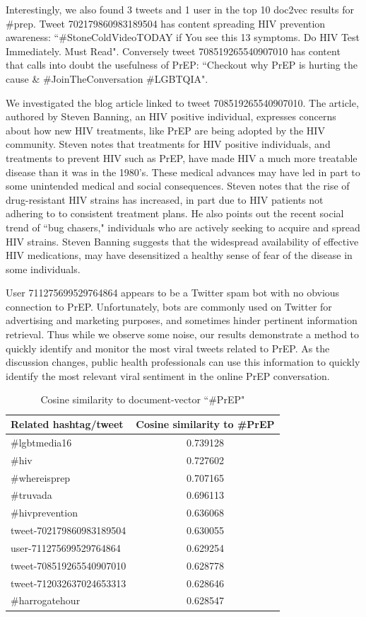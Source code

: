 \documentclass{sig-alternate-05-2015}
\begin{document}
Interestingly, we also found 3 tweets and 1 user in the top 10 doc2vec results for \#prep. Tweet 702179860983189504 has content spreading HIV prevention awareness: ``\#StoneColdVideoTODAY if You see this 13 symptoms. Do HIV Test Immediately. Must Read". Conversely tweet 708519265540907010 has content that calls into doubt the usefulness of PrEP: ``Checkout why PrEP is hurting the cause \& \#JoinTheConversation \#LGBTQIA".

We investigated the blog article linked to tweet 708519265540907010\cite{prephurtingcause}. The article, authored by Steven Banning, an HIV positive individual, expresses concerns about how new HIV treatments, like PrEP are being adopted by the HIV community. Steven notes that treatments for HIV positive individuals, and treatments to prevent HIV such as PrEP, have made HIV a much more treatable disease than it was in the 1980's. These medical advances may have led in part to some unintended medical and social consequences. Steven notes that the rise of drug-resistant HIV strains has increased, in part due to HIV patients not adhering to to consistent treatment plans. He also points out the recent social trend of ``bug chasers," individuals who are actively seeking to acquire and spread HIV strains. Steven Banning suggests that the widespread availability of effective HIV medications, may have desensitized a healthy sense of fear of the disease in some individuals.

User 711275699529764864 appears to be a Twitter spam bot with no obvious connection to PrEP. Unfortunately, bots are commonly used on Twitter for advertising and marketing purposes, and sometimes hinder pertinent information retrieval. Thus while we observe some noise, our results demonstrate a method to quickly identify and monitor the most viral tweets related to PrEP. As the discussion changes, public health professionals can use this information to quickly identify the most relevant viral sentiment in the online PrEP conversation.

\begin{table}
\centering
\caption{Cosine similarity to document-vector ``\#PrEP"}
\begin{tabular}{|l|c|} \hline
Related hashtag/tweet & Cosine similarity to \#PrEP\\ \hline
\#lgbtmedia16 & 0.739128\\ \hline
\#hiv & 	0.727602 \\ \hline
\#whereisprep & 0.707165 \\ \hline
\#truvada & 0.696113 \\ \hline
\#hivprevention & 0.636068 \\ \hline
tweet-702179860983189504 & 0.630055\\ \hline
user-711275699529764864 & 0.629254\\ \hline
tweet-708519265540907010 & 0.628778 \\ \hline
tweet-712032637024653313 & 0.628646 \\ \hline
\#harrogatehour & 0.628547 \\ \hline
\hline\end{tabular}
\end{table}
\end{document}
